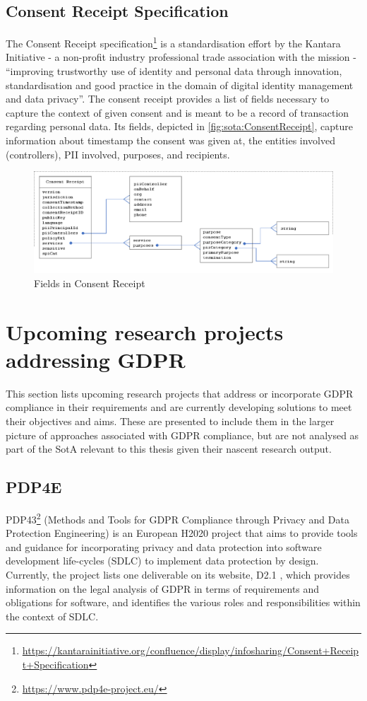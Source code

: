 \subsection*{Consent Receipt Specification}
The Consent Receipt specification\footnote{\url{https://kantarainitiative.org/confluence/display/infosharing/Consent+Receipt+Specification}} \cite{lizar_consent_2017} is a standardisation effort by the Kantara Initiative - a non-profit industry professional trade association with the mission - ``improving trustworthy use of identity and personal data through innovation, standardisation and good practice in the domain of digital identity management and data privacy''. The consent receipt provides a list of fields necessary to capture the context of given consent and is meant to be a record of transaction regarding personal data. Its fields, depicted in \autoref{fig:sota:ConsentReceipt}, capture information about timestamp the consent was given at, the entities involved (controllers), PII involved, purposes, and recipients.
\begin{figure}[htbp]
    \centering
    \includegraphics[width=\linewidth]{img/ConsentReceipt.png}
    \caption{Fields in Consent Receipt \cite{lizar_consent_2017}}
    \label{fig:sota:ConsentReceipt}
\end{figure}

\section{Upcoming research projects addressing GDPR}
This section lists upcoming research projects that address or incorporate GDPR compliance in their requirements and are currently developing solutions to meet their objectives and aims. These are presented to include them in the larger picture of approaches associated with GDPR compliance, but are not analysed as part of the SotA relevant to this thesis given their nascent research output.

\subsection*{PDP4E}
PDP43\footnote{\url{https://www.pdp4e-project.eu/}} (Methods and Tools for GDPR Compliance through Privacy and Data Protection Engineering) is an European H2020 project that aims to provide tools and guidance for incorporating privacy and data protection into software development life-cycles (SDLC) to implement data protection by design. Currently, the project lists one deliverable on its website, D2.1 \cite{noauthor_d2.1_2019}, which provides information on the legal analysis of GDPR in terms of requirements and obligations for software, and identifies the various roles and responsibilities within the context of SDLC.

